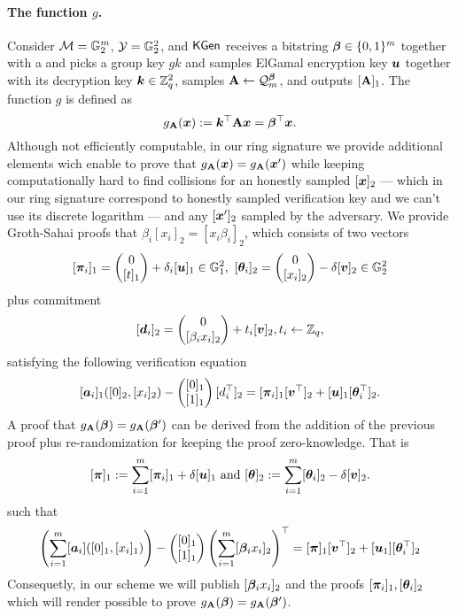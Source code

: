 \paragraph{The function $g$.} Consider $\mathcal{M}=\mathbb{G}^m_2$, $\mathcal{Y}=\mathbb{G}_2^2$, and $\mathsf{KGen}$ receives a bitstring ${\boldsymbol{\beta}}\in\{0,1\}^m$ together with a and picks a group key $gk$ and samples ElGamal encryption key ${\boldsymbol{u}}$ together with its decryption key ${\boldsymbol{k}}\in\mathbb{Z}_q^2$, samples $\mathbf{{A}}\gets\mathcal{Q}_m^{\boldsymbol{\beta}}$, and outputs $[\mathbf{{A}}]_1$. The function $g$ is defined as
$$
g_{\mathbf{{A}}}({\boldsymbol{x}}):= {\boldsymbol{k}}^\top\mathbf{{A}}{\boldsymbol{x}}={\boldsymbol{\beta}}^\top{\boldsymbol{x}}.
$$
Although not efficiently computable, in our ring signature we provide additional elements wich enable to prove that 
 $g_{\mathbf{{A}}}({\boldsymbol{x}}) = g_{\mathbf{{A}}}({\boldsymbol{x}}')$ while keeping computationally hard to find collisions for an honestly sampled $[{\boldsymbol{x}}]_2$ --- which in our ring signature correspond to honestly sampled verification key and we can't use its discrete logarithm ---  and any $[{\boldsymbol{x}}']_2$ sampled by the adversary.
We provide Groth-Sahai proofs that $\beta_i[x_i]_2=[x_i\beta_i]_2$, which consists of two vectors
$$
[\vecb{\pi}_i]_1 = \pmatri{0\\{[t]_1}}+\delta_i[\vecb{u}]_1\in\GG_1^2,\ [\vecb{\theta}_i]_2=\pmatri{0\\{[x_i]_2}}-\delta[\vecb{v}]_2\in\GG_2^2
$$
plus commitment
$$
[{\boldsymbol{d}}_i]_2 = \left(\begin{matrix}0\\ [\beta_ix_i]_2\end{matrix}\right) + t_i[{\boldsymbol{v}}]_2, t_i\gets\mathbb{Z}_q,
$$
satisfying the following verification equation
$$ 
[{\boldsymbol{a}}_i]_1([0]_2, {[x_i]_2})-\left(\begin{matrix}[0]_1\\{[1]_1}\end{matrix}\right)[d^\top_i]_2 =[{\boldsymbol{\pi}}_i]_1[{\boldsymbol{v}}^\top]_2+[{\boldsymbol{u}}]_1[{\boldsymbol{\theta}}^\top_i]_2.
$$
A proof that $g_{\mathbf{{A}}}({\boldsymbol{\beta}}) = g_{\mathbf{{A}}}({\boldsymbol{\beta}}')$ can be derived from the addition of the previous proof plus re-randomization for keeping the proof zero-knowledge. That is
$$
[{\boldsymbol{\pi}}]_1 := \sum_{i=1}^m [{\boldsymbol{\pi}}_i]_1+\delta[{\boldsymbol{u}}]_1
\text{ and }
[{\boldsymbol{\theta}}]_2 := \sum_{i=1}^m [{\boldsymbol{\theta}}_i]_2-\delta[{\boldsymbol{v}}]_2.
$$
such that
$$
\left(\sum_{i=1}^m [{\boldsymbol{a}}_i]([0]_1,[x_i]_1)\right)-\left(\begin{matrix}{[0]_1}\\{[1]_1}\end{matrix}\right)\left(\sum_{i=1}^m[{\boldsymbol{\beta}}_ix_i]_2\right)^\top =
[{\boldsymbol{\pi}}]_1[{\boldsymbol{v}}^\top]_2 + [{\boldsymbol{u}}_1][{\boldsymbol{\theta}}_i^\top]_2
$$ Consequetly, in our scheme we will publish  $[{\boldsymbol{\beta}}_ix_i]_2$ and the proofs $[{\boldsymbol{\pi}}_i]_1,[{\boldsymbol{\theta}}_i]_2$ which will render possible to prove $g_{\mathbf{{A}}}({\boldsymbol{\beta}})=g_{\mathbf{{A}}}({\boldsymbol{\beta}}')$.

